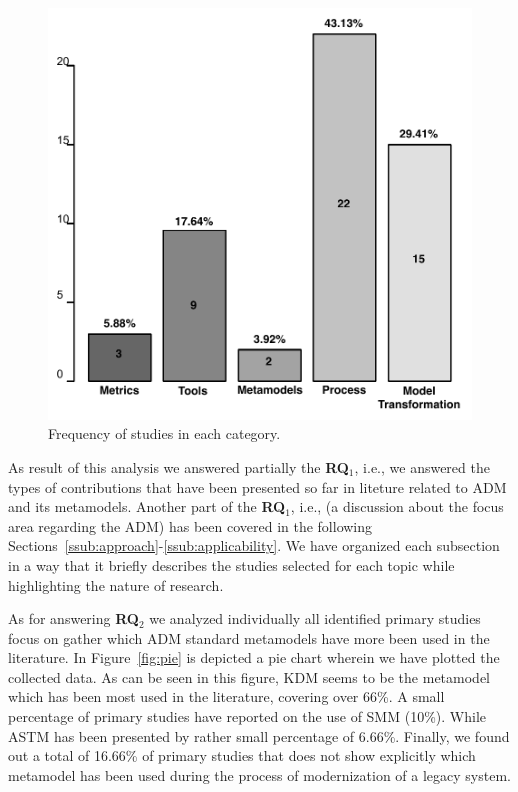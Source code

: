 
\begin{figure}[!h]
 \centering
  \includegraphics[scale=0.3]{figuras/NovoBarFormated}
 \caption{Frequency of studies in each category.}
 \label{fig:bar}
 \end{figure} 

 As result of this analysis we answered partially the \textbf{RQ$_1$}, i.e., we answered the types of contributions that have been presented so far in liteture related to ADM and its metamodels. Another part of the \textbf{RQ$_1$}, i.e., (a discussion about the focus area regarding the ADM) has been covered in the following Sections~\ref{ssub:approach}-\ref{ssub:applicability}. We have organized each subsection in a way that it briefly describes the studies selected for each topic while highlighting the nature of research.

As for answering \textbf{RQ$_2$} we analyzed individually all identified primary studies focus on gather which ADM standard metamodels have more been used in the literature.  In Figure~\ref{fig:pie} is depicted a pie chart wherein we have plotted the collected data. As can be seen in this figure, KDM seems to be the metamodel which has been most used in the literature, covering over 66\%. A small percentage of primary studies have reported on the use of SMM (10\%). While ASTM has been presented by rather small percentage of 6.66\%. Finally, we found out a total of 16.66\% of primary studies that does not show explicitly which metamodel has been used during the process of modernization of a legacy system. 

